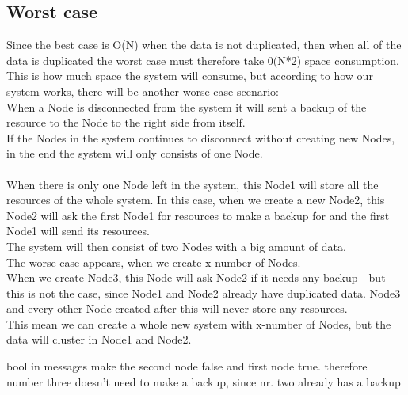 \subsection{Worst case}
Since the best case is O(N) when the data is not duplicated, then when all of the data is duplicated the worst case must therefore take 0(N*2) space consumption. \\
This is how much space the system will consume, but according to how our system works, there will be another worse case scenario: \\
When a Node is disconnected from the system it will sent a backup of the resource to the Node to the right side from itself. \\
If the Nodes in the system continues to disconnect without creating new Nodes, in the end the system will only consists of one Node. \\\\
When there is only one Node left in the system, this Node1 will store all the resources of the whole system. In this case, when we create a new Node2, this Node2 will ask the first Node1 for resources to make a backup for and the first Node1 will send its resources. \\ The system will then consist of two Nodes with a big amount of data.\\
The worse case appears, when we create x-number of Nodes. \\
When we create Node3, this Node will ask Node2 if it needs any backup - but this is not the case, since Node1 and Node2 already have duplicated data. Node3 and every other Node created after this will never store any resources.\\
This mean we can create a whole new system with x-number of Nodes, but the data will cluster in Node1 and Node2. 


bool in messages make the second node false and first node true. therefore number three doesn't need to make a backup, since nr. two already has a backup 



